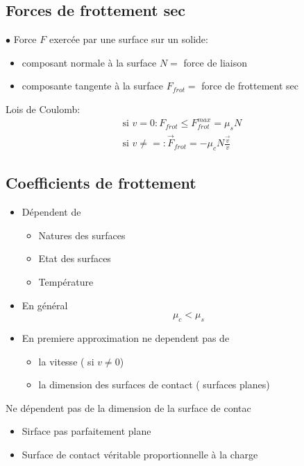 \documentclass[../main.tex]{subfiles}
\begin{document}
\subsection{Forces de frottement sec}
$\bullet$ Force $F$ exercée par une surface sur un solide:\\
\begin{itemize}
\item composant normale à la surface $N=$ force de liaison
\item composante tangente à la surface $F_{frot} =$ force de frottement sec
\end{itemize}
Lois de Coulomb:\\
\begin{align*}
\text{ si } v=0: F_{frot} \leq F_{frot} ^{max} = \mu_s N\\
\text{ si } v\neq=: \vec{F}_{frot} = -\mu_c N \frac{\vec{v}}{v}
\end{align*}
\subsection{Coefficients de frottement}
\begin{itemize}
\item Dépendent de
	\begin{itemize}
	\item Natures des surfaces
	\item Etat des surfaces
	\item Température
	\end{itemize}
	
\item En général
	\[ 
	\mu_c < \mu_s
	\]
	
\item En premiere approximation ne dependent pas de 
	\begin{itemize}
		\item la vitesse ( si $ v \neq 0$)
		\item la dimension des surfaces de contact ( surfaces planes)
	\end{itemize}
\end{itemize}
Ne dépendent pas de la dimension de la surface de contac
\begin{itemize}
\item Sirface pas parfaitement plane
\item Surface de contact véritable proportionnelle à la charge
\end{itemize}
\end{document}
